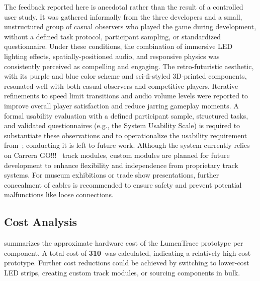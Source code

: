 \documentclass[10pt,journal,final,a4paper]{IEEEtran}
\begin{document}
The feedback reported here is anecdotal rather than the result of a controlled user study. It was gathered informally from the three developers and a small, unstructured group of casual observers who played the game during development, without a defined task protocol, participant sampling, or standardized questionnaire. Under these conditions, the combination of immersive LED lighting effects, spatially-positioned audio, and responsive physics was consistently perceived as compelling and engaging. The retro-futuristic aesthetic, with its purple and blue color scheme and sci-fi-styled 3D-printed components, resonated well with both casual observers and competitive players. Iterative refinements to speed limit transitions and audio volume levels were reported to improve overall player satisfaction and reduce jarring gameplay moments. A formal usability evaluation with a defined participant sample, structured tasks, and validated questionnaires (e.g., the System Usability Scale) is required to substantiate these observations and to operationalize the usability requirement from~; conducting it is left to future work. Although the system currently relies on Carrera GO!!!~\cite{carrera:2026carrera} track modules, custom modules are planned for future development to enhance flexibility and independence from proprietary track systems. For museum exhibitions or trade show presentations, further concealment of cables is recommended to ensure safety and prevent potential malfunctions like loose connections.

\subsection{Cost Analysis}
\label{subsec:cost-analysis}

 summarizes the approximate hardware cost of the LumenTrace prototype per component. A total cost of \textbf{310\,\texteuro} was calculated, indicating a relatively high-cost prototype. Further cost reductions could be achieved by switching to lower-cost LED strips, creating custom track modules, or sourcing components in bulk.   
\end{document}

